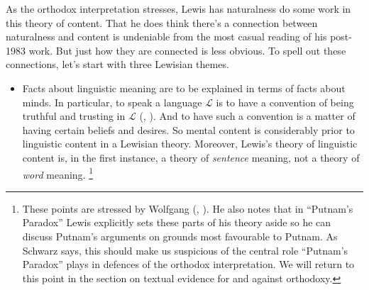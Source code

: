 \documentclass[
  10pt,
  letterpaper,
  DIV=11,
  numbers=noendperiod,
  twoside]{scrartcl}
\begin{document}
As the orthodox interpretation stresses, Lewis has naturalness do some
work in this theory of content. That he does think there's a connection
between naturalness and content is undeniable from the most casual
reading of his post-1983 work. But just how they are connected is less
obvious. To spell out these connections, let's start with three Lewisian
themes.

\begin{itemize}
\item
  Facts about linguistic meaning are to be explained in terms of facts
  about minds. In particular, to speak a language \(\mathcal{L}\) is to
  have a convention of being truthful and trusting in \(\mathcal{L}\)
  (,
  ). And to have such a convention is a
  matter of having certain beliefs and desires. So mental content is
  considerably prior to linguistic content in a Lewisian theory.
  Moreover, Lewis's theory of linguistic content is, in the first
  instance, a theory of \emph{sentence} meaning, not a theory of
  \emph{word} meaning. \footnote{These points are stressed by Wolfgang
    (,
    ). He also notes that in ``Putnam's
    Paradox'' Lewis explicitly sets these parts of his theory aside so
    he can discuss Putnam's arguments on grounds most favourable to
    Putnam. As Schwarz says, this should make us suspicious of the
    central role ``Putnam's Paradox'' plays in defences of the orthodox
    interpretation. We will return to this point in the section on
    textual evidence for and against orthodoxy.

}
\end{itemize}
\end{document}
